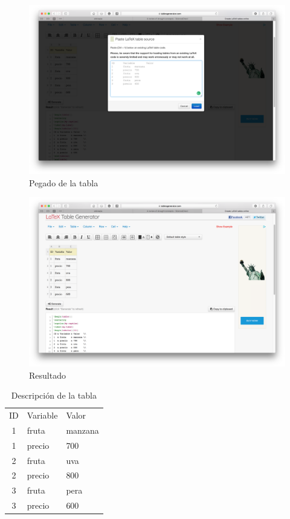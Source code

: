 \documentclass[11pt,]{article}
\begin{document}
\begin{figure}[!h]
\begin{center}
\includegraphics[width=\textwidth]{Figuras/tabla1.png}
\caption{Pegado de la tabla}
\label{tabla1}
\end{center}
\end{figure}

\begin{figure}[!h]
\begin{center}
\includegraphics[width=\textwidth]{Figuras/tabla2.png}
\caption{Resultado}
\label{tabla2}
\end{center}
\end{figure}

\clearpage

\begin{table}[]
\centering
\caption{Descripción de la tabla}
\label{etiqueta_tabla}
\begin{tabular}{cll}
ID & Variable & Valor   \\
1  & fruta    & manzana \\
1  & precio   & 700     \\
2  & fruta    & uva     \\
2  & precio   & 800     \\
3  & fruta    & pera    \\
3  & precio   & 600    
\end{tabular}
\end{table}




\end{document}
